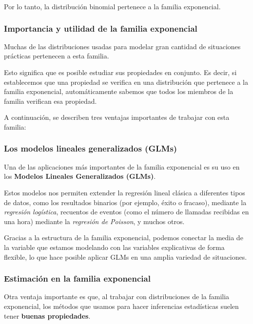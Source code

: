 \documentclass[
]{article}
\begin{document}
Por lo tanto, la distribución binomial pertenece a la familia exponencial.

\subsubsection{Importancia y utilidad de la familia exponencial}\label{importancia-y-utilidad-de-la-familia-exponencial}

Muchas de las distribuciones usadas para modelar gran cantidad de situaciones prácticas pertenecen a esta familia.

Esto significa que es posible estudiar sus propiedades en conjunto. Es decir, si establecemos que una propiedad se verifica en una distribución que pertenece a la familia exponencial, automáticamente sabemos que todos los miembros de la familia verifican esa propiedad.

A continuación, se describen tres ventajas importantes de trabajar con esta familia:

\subsubsection{Los modelos lineales generalizados (GLMs)}\label{los-modelos-lineales-generalizados-glms}

Una de las aplicaciones más importantes de la familia exponencial es su uso en los \textbf{Modelos Lineales Generalizados (GLMs)}.

Estos modelos nos permiten extender la regresión lineal clásica a diferentes tipos de datos, como los resultados binarios (por ejemplo, éxito o fracaso), mediante la \emph{regresión logística}, recuentos de eventos (como el número de llamadas recibidas en una hora) mediante la \emph{regresión de Poisson}, y muchos otros.

Gracias a la estructura de la familia exponencial, podemos conectar la media de la variable que estamos modelando con las variables explicativas de forma flexible, lo que hace posible aplicar GLMs en una amplia variedad de situaciones.

\subsubsection{Estimación en la familia exponencial}\label{estimaciuxf3n-en-la-familia-exponencial}

Otra ventaja importante es que, al trabajar con distribuciones de la familia exponencial, los métodos que usamos para hacer inferencias estadísticas suelen tener \textbf{buenas propiedades}.
\end{document}
